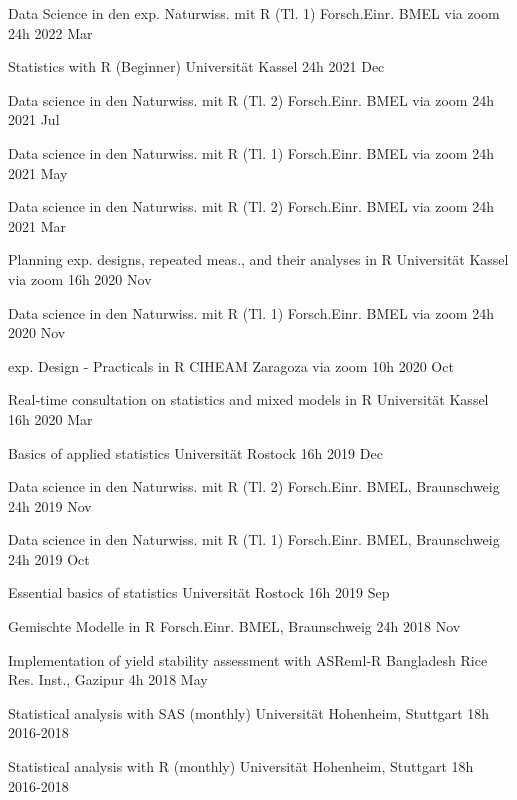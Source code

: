 \documentclass[11pt,a4paper,]{awesome-cv}
\begin{document}
\begin{cvhonors}
\cvhonor
{Data Science in den exp. Naturwiss. mit R (Tl. 1)  }
{Forsch.Einr. BMEL via zoom}
{24h}
{2022 Mar  }

\cvhonor
{Statistics with R (Beginner)  }
{Universität Kassel}
{24h}
{2021 Dec  }

\cvhonor
{Data science in den Naturwiss. mit R (Tl. 2)  }
{Forsch.Einr. BMEL via zoom}
{24h}
{2021 Jul  }

\cvhonor
{Data science in den Naturwiss. mit R (Tl. 1)  }
{Forsch.Einr. BMEL via zoom}
{24h}
{2021 May  }

\cvhonor
{Data science in den Naturwiss. mit R (Tl. 2)  }
{Forsch.Einr. BMEL via zoom}
{24h}
{2021 Mar  }

\cvhonor
{Planning exp. designs, repeated meas., and their analyses in R  }
{Universität Kassel via zoom}
{16h}
{2020 Nov  }

\cvhonor
{Data science in den Naturwiss. mit R (Tl. 1)  }
{Forsch.Einr. BMEL via zoom}
{24h}
{2020 Nov  }

\cvhonor
{exp. Design - Practicals in R  }
{CIHEAM Zaragoza via zoom}
{10h}
{2020 Oct  }

\cvhonor
{Real‑time consultation on statistics and mixed models in R  }
{Universität Kassel}
{16h}
{2020 Mar  }

\cvhonor
{Basics of applied statistics  }
{Universität Rostock}
{16h}
{2019 Dec  }

\cvhonor
{Data science in den Naturwiss. mit R (Tl. 2)  }
{Forsch.Einr. BMEL, Braunschweig}
{24h}
{2019 Nov  }

\cvhonor
{Data science in den Naturwiss. mit R (Tl. 1)  }
{Forsch.Einr. BMEL, Braunschweig}
{24h}
{2019 Oct  }

\cvhonor
{Essential basics of statistics  }
{Universität Rostock}
{16h}
{2019 Sep  }

\cvhonor
{Gemischte Modelle in R  }
{Forsch.Einr. BMEL, Braunschweig}
{24h}
{2018 Nov  }

\cvhonor
{Implementation of yield stability assessment with ASReml‑R  }
{Bangladesh Rice Res. Inst., Gazipur}
{4h}
{2018 May  }

\cvhonor
{Statistical analysis with SAS (monthly)  }
{Universität Hohenheim, Stuttgart}
{18h}
{2016‑2018  }

\cvhonor
{Statistical analysis with R (monthly)  }
{Universität Hohenheim, Stuttgart}
{18h}
{2016‑2018  }\end{cvhonors}

\end{document}
